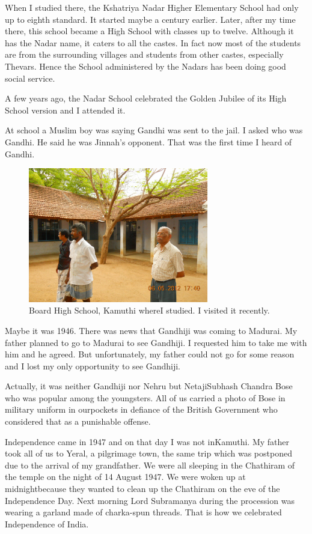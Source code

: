 When I studied there, the Kshatriya Nadar Higher Elementary School had 
only up to eighth standard. It started maybe a century earlier. Later, 
after my time there, this school became a High School with classes up to 
twelve. Although it has the Nadar name, it caters to all the castes. 
In fact now most of the students are from the surrounding villages and 
students from other castes, especially Thevars. Hence 
the School administered by the Nadars has been doing good social 
service.

A few years ago, the Nadar School celebrated the Golden Jubilee of its 
High School version and I attended it.

At school a Muslim boy was saying Gandhi was sent to the jail. I asked 
who was Gandhi. He said he was Jinnah's opponent. That was the first 
time I heard of Gandhi.

\begin{figure}[H]
\centering
\includegraphics[width=0.7\textwidth]{images/new-images/04-Rajaji-school.jpg}
\caption{Board High School, Kamuthi where\break I studied. I visited it recently.}
\end{figure}

Maybe it was 1946. There was news that Gandhiji was coming to Madurai. 
My father planned to go to Madurai to see Gandhiji. I requested him to 
take me with him and he agreed. But unfortunately, my father could not 
go for some reason and I lost my only opportunity to see Gandhiji.

Actually, it was neither Gandhiji nor Nehru but Netaji\break Subhash Chandra 
Bose who was popular among the youngsters. All of us carried a photo of 
Bose in military uniform in our\break pockets in defiance of the British 
Government who considered that as a punishable offense.

Independence came in 1947 and on that day I was not in\break Kamuthi. My 
father took all of us to Yeral, a pilgrimage town, the same trip which 
was postponed due to the arrival of my grandfather. We were all sleeping 
in the Chathiram of the temple on the night of 14 August 1947. We were 
woken up at midnight\break because they wanted to clean up the Chathiram on 
the eve of the Independence Day. Next morning Lord Subramanya during the 
procession was wearing a garland made of charka-spun threads. That is 
how we celebrated Independence of India.

